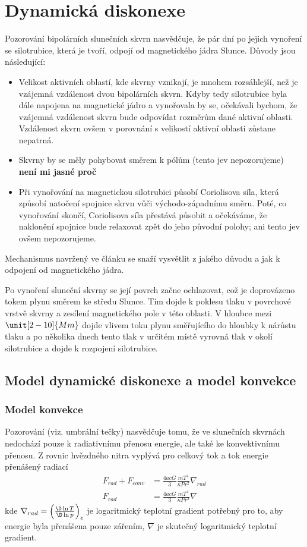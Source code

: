 \chapter{Dynamická diskonexe}

Pozorování bipolárních slunečních skvrn nasvědčuje, že pár dní po jejich vynoření se silotrubice, která je tvoří, odpojí od magnetického jádra Slunce. Důvody jsou následující:
\begin{itemize}
	\item Velikost aktivních oblastí, kde skvrny vznikají, je mnohem rozsáhlejší, než je vzájemná vzdálenost dvou bipolárních skvrn. Kdyby tedy silotrubice byla dále napojena na magnetické jádro a vynořovala by se, očekávali bychom, že vzájemná vzdálenost skvrn bude odpovídat rozměrům dané aktivní oblasti. Vzdálenost skvrn ovšem v porovnání s velikostí aktivní oblasti zůstane nepatrná.
	\item Skvrny by se měly pohybovat směrem k pólům (tento jev nepozorujeme) \textbf{není mi jasné proč}
	\item Při vynořování na magnetickou silotrubici působí Coriolisova síla, která způsobí natočení spojnice skrvn vůči východo-západnímu směru. Poté, co vynořování skončí, Coriolisova síla přestává působit a očekáváme, že naklonění spojnice bude relaxovat zpět do jeho původní polohy; ani tento jev ovšem nepozorujeme.
\end{itemize}

Mechanismus navržený ve článku \cite{dd} se snaží vysvětlit z jakého důvodu a jak k odpojení od magnetického jádra.

Po vynoření sluneční skvrny se její povrch začne ochlazovat, což je doprovázeno tokem plynu směrem ke středu Slunce. Tím dojde k poklesu tlaku v povrchové vrstvě skvrny a zesílení magnetického pole v této oblasti. V hloubce mezi $\unit[2-10]{Mm}$ dojde vlivem toku plynu směřujícího do hloubky k nárůstu tlaku a po několika dnech tento tlak v určitém místě vyrovná tlak v okolí silotrubice a dojde k rozpojení silotrubice.

\section{Model dynamické diskonexe a model konvekce}

\subsection{Model konvekce}
Pozorování (viz. umbrální tečky) nasvědčuje tomu, že ve slunečních skvrnách nedochází pouze k radiativnímu přenosu energie, ale také ke konvektivnímu přenosu. Z rovnic hvězdného nitra vyplývá pro celkový tok a tok energie přenášený radiací
\begin{align}
	F_{rad}+F_{conv} &= \frac{4acG}{3}\frac{mT^4}{\kappa P r^2}\nabla_{rad} \label{eq:celk_tok}\\
	F_{rad} &= \frac{4acG}{3}\frac{mT^4}{\kappa P r^2}\nabla \label{eq:frad}
\end{align}
kde $\nabla_{rad}=\left(\frac{\D\ln T}{\D\ln p}\right)_e$ je logaritmický teplotní gradient potřebný pro to, aby energie byla přenášena pouze zářením, $\nabla$ je skutečný logaritmický teplotní gradient.

